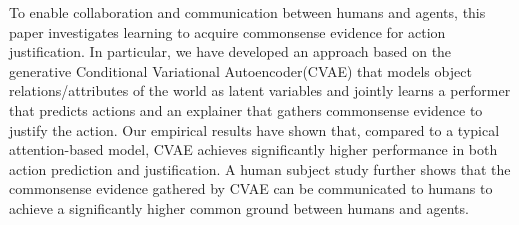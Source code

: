 To enable collaboration and communication between humans and agents, this paper investigates learning to acquire commonsense evidence for action justification. In particular, we have developed an approach based on the generative Conditional Variational Autoencoder(CVAE) that models object relations/attributes of the world as latent variables and jointly learns a performer that predicts actions and an explainer that gathers commonsense evidence to justify the action. Our empirical results have shown that, compared to a typical attention-based model, CVAE achieves significantly higher performance in both action prediction and justification. A human subject study further shows that the commonsense evidence gathered by CVAE can be communicated to humans to achieve a significantly higher common ground between humans and agents.
